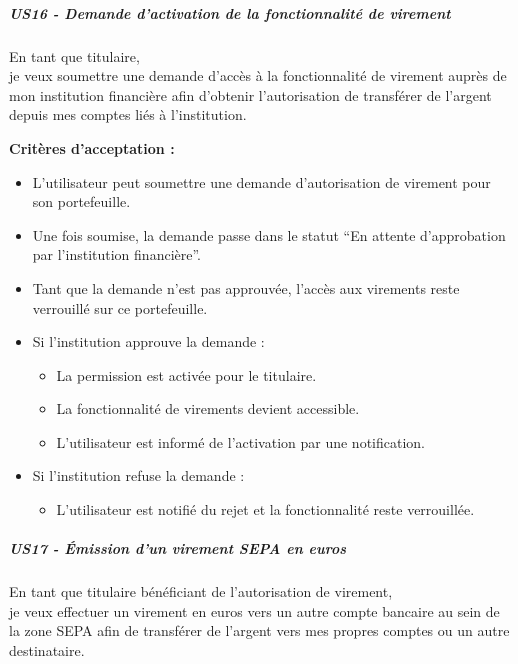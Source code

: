 \hypertarget{us16---demande-dactivation-de-la-fonctionnalituxe9-de-virement}{%
\subparagraph{US16 - Demande d'activation de la fonctionnalité de
virement}\label{us16---demande-dactivation-de-la-fonctionnalituxe9-de-virement}}

En tant que titulaire,\\
je veux soumettre une demande d'accès à la fonctionnalité de virement
auprès de mon institution financière afin d'obtenir l'autorisation de
transférer de l'argent depuis mes comptes liés à l'institution.

\textbf{Critères d'acceptation :}

\begin{itemize}
\tightlist
\item
  L'utilisateur peut soumettre une demande d'autorisation de virement
  pour son portefeuille.
\item
  Une fois soumise, la demande passe dans le statut ``En attente
  d'approbation par l'institution financière''.
\item
  Tant que la demande n'est pas approuvée, l'accès aux virements reste
  verrouillé sur ce portefeuille.
\item
  Si l'institution approuve la demande :

  \begin{itemize}
  \tightlist
  \item
    La permission est activée pour le titulaire.
  \item
    La fonctionnalité de virements devient accessible.
  \item
    L'utilisateur est informé de l'activation par une notification.
  \end{itemize}
\item
  Si l'institution refuse la demande :

  \begin{itemize}
  \tightlist
  \item
    L'utilisateur est notifié du rejet et la fonctionnalité reste
    verrouillée.
  \end{itemize}
\end{itemize}

\hypertarget{us17---uxe9mission-dun-virement-sepa-en-euros}{%
\subparagraph{US17 - Émission d'un virement SEPA en
euros}\label{us17---uxe9mission-dun-virement-sepa-en-euros}}

En tant que titulaire bénéficiant de l'autorisation de virement,\\
je veux effectuer un virement en euros vers un autre compte bancaire au
sein de la zone SEPA afin de transférer de l'argent vers mes propres
comptes ou un autre destinataire.

